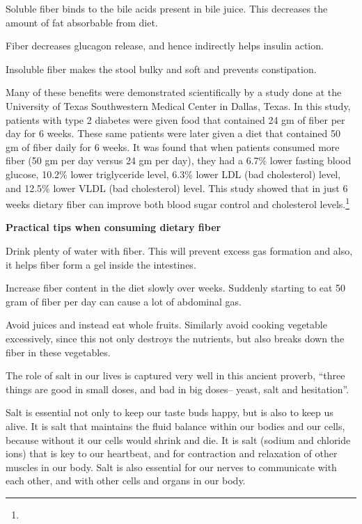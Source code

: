  \item Soluble fiber binds to the bile acids present in bile juice. This decreases the amount of fat absorbable from diet.

 \item Fiber decreases glucagon release, and hence indirectly helps insulin action.

 \item Insoluble fiber makes the stool bulky and soft and prevents constipation.

Many of these benefits were demonstrated scientifically by a study done at the University of Texas Southwestern Medical Center in Dallas, Texas. In this study, patients with type 2 diabetes were given food that contained 24 gm of fiber per day for 6 weeks. These same patients were later given a diet that contained 50 gm of fiber daily for 6 weeks. It was found that when patients consumed more fiber (50 gm per day versus 24 gm per day), they had a 6.7\% lower fasting blood glucose, 10.2\% lower triglyceride level, 6.3\% lower LDL (bad cholesterol) level, and 12.5\% lower VLDL (bad cholesterol) level. This study showed that in just 6 weeks dietary fiber can improve both blood sugar control and cholesterol levels.\footnote{}

\textbf{Practical tips when consuming dietary fiber}

\item Drink plenty of water with fiber. This will prevent excess gas formation and also, it helps fiber form a gel inside the intestines.

 \item Increase fiber content in the diet slowly over weeks. Suddenly starting to eat 50 gram of fiber per day can cause a lot of abdominal gas.

 \item Avoid juices and instead eat whole fruits. Similarly avoid cooking vegetable excessively, since this not only destroys the nutrients, but also breaks down the fiber in these vegetables.


The role of salt in our lives is captured very well in this ancient proverb, “three things are good in small doses, and bad in big doses– yeast, salt and hesitation”.

Salt is essential not only to keep our taste buds happy, but is also to keep us alive. It is salt that maintains the fluid balance within our bodies and our cells, because without it our cells would shrink and die. It is salt (sodium and chloride ions) that is key to our heartbeat, and for contraction and relaxation of other muscles in our body. Salt is also essential for our nerves to communicate with each other, and with other cells and organs in our body.


